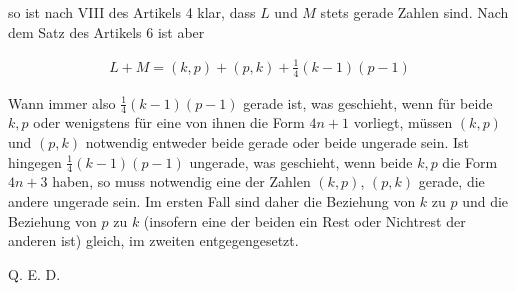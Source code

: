 so ist nach VIII des Artikels 4 klar, dass $L$ und $M$ stets gerade Zahlen sind. Nach dem Satz des Artikels 6 ist aber

\[
\begin{aligned}
L+M=(k,p)+(p,k)+\tfrac14(k-1)(p-1)
\end{aligned}
\]

Wann immer also $\frac14(k-1)(p-1)$ gerade ist, was geschieht, wenn für beide $k,p$ oder wenigstens für eine von ihnen die Form $4n+1$ vorliegt, müssen $(k,p)$ und $(p,k)$ notwendig entweder beide gerade oder beide ungerade sein. Ist hingegen $\frac14(k-1)(p-1)$ ungerade, was geschieht, wenn beide $k,p$ die Form $4n+3$ haben, so muss notwendig eine der Zahlen $(k,p)$, $(p,k)$ gerade, die andere ungerade sein. Im ersten Fall sind daher die Beziehung von $k$ zu $p$ und die Beziehung von $p$ zu $k$ (insofern eine der beiden ein Rest oder Nichtrest der anderen ist) gleich, im zweiten entgegengesetzt.

Q. E. D.

\BookRule{35mm}
